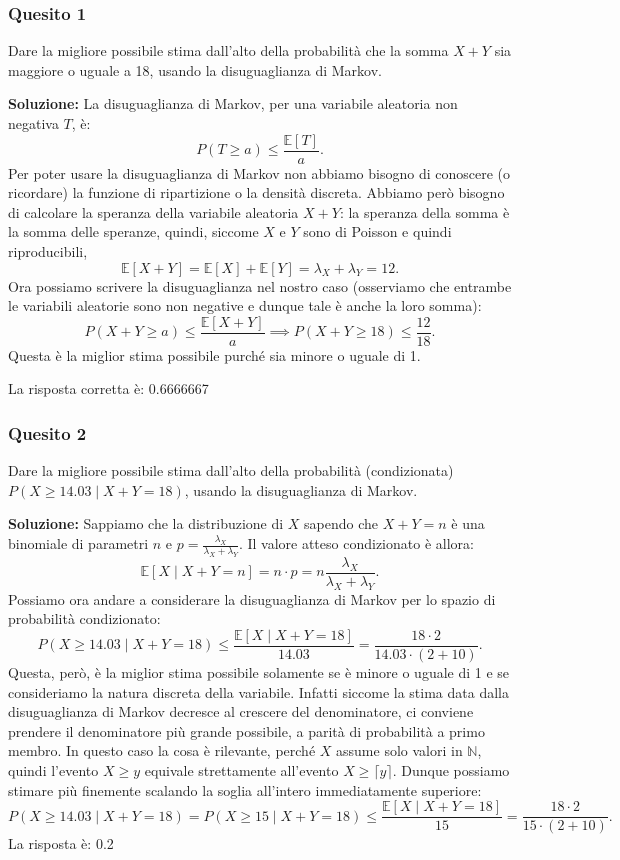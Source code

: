 \documentclass[12pt, a4paper]{article}
\begin{document}
\subsubsection*{Quesito 1}
Dare la migliore possibile stima dall’alto della probabilità che la somma $X+Y$ sia maggiore o uguale a 18, usando la disuguaglianza di Markov.

\textbf{Soluzione:}
La disuguaglianza di Markov, per una variabile aleatoria non negativa $T$, è:
$$ P(T \geq a) \leq \frac{\mathbb{E}[T]}{a}. $$
Per poter usare la disuguaglianza di Markov non abbiamo bisogno di conoscere (o ricordare) la funzione di ripartizione o la densità discreta. Abbiamo però bisogno di calcolare la speranza della variabile aleatoria $X+Y$: la speranza della somma è la somma delle speranze, quindi, siccome $X$ e $Y$ sono di Poisson e quindi riproducibili,
$$ \mathbb{E}[X+Y] = \mathbb{E}[X] + \mathbb{E}[Y] = \lambda_X + \lambda_Y = 12. $$
Ora possiamo scrivere la disuguaglianza nel nostro caso (osserviamo che entrambe le variabili aleatorie sono non negative e dunque tale è anche la loro somma):
$$ P(X+Y \geq a) \leq \frac{\mathbb{E}[X+Y]}{a} \implies P(X+Y \geq 18) \leq \frac{12}{18}. $$
Questa è la miglior stima possibile purché sia minore o uguale di 1.

La risposta corretta è: 0.6666667

\subsubsection*{Quesito 2}
Dare la migliore possibile stima dall’alto della probabilità (condizionata) $P(X \geq 14.03 \mid X+Y=18)$, usando la disuguaglianza di Markov.

\textbf{Soluzione:}
Sappiamo che la distribuzione di $X$ sapendo che $X+Y=n$ è una binomiale di parametri $n$ e $p = \frac{\lambda_X}{\lambda_X+\lambda_Y}$.
Il valore atteso condizionato è allora:
$$ \mathbb{E}[X \mid X+Y=n] = n \cdot p = n\frac{\lambda_X}{\lambda_X+\lambda_Y}. $$
Possiamo ora andare a considerare la disuguaglianza di Markov per lo spazio di probabilità condizionato:
$$ P(X \geq 14.03 \mid X+Y=18) \leq \frac{\mathbb{E}[X \mid X+Y=18]}{14.03} = \frac{18 \cdot 2}{14.03 \cdot (2+10)}. $$
Questa, però, è la miglior stima possibile solamente se è minore o uguale di 1 e se consideriamo la natura discreta della variabile.
Infatti siccome la stima data dalla disuguaglianza di Markov decresce al crescere del denominatore, ci conviene prendere il denominatore più grande possibile, a parità di probabilità a primo membro. In questo caso la cosa è rilevante, perché $X$ assume solo valori in $\mathbb{N}$, quindi l'evento $X \geq y$ equivale strettamente all'evento $X \geq \lceil y \rceil$.
Dunque possiamo stimare più finemente scalando la soglia all'intero immediatamente superiore:
$$ P(X \geq 14.03 \mid X+Y=18) = P(X \geq 15 \mid X+Y=18) \leq \frac{\mathbb{E}[X \mid X+Y=18]}{15} = \frac{18 \cdot 2}{15 \cdot (2+10)}. $$
La risposta è: 0.2
\end{document}
